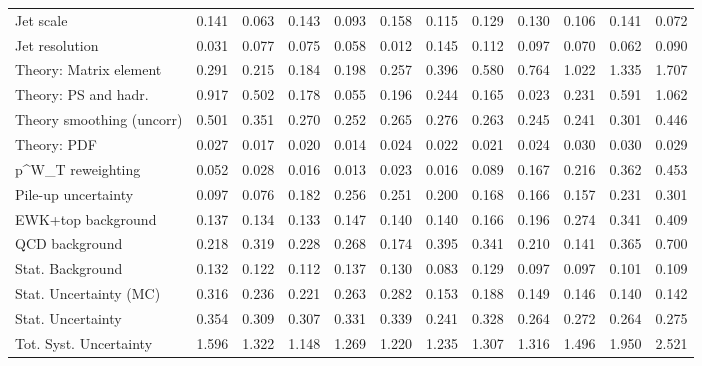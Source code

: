 \begin{tabular}{l|p{0.6cm}p{0.6cm}p{0.6cm}p{0.6cm}p{0.6cm}p{0.6cm}p{0.6cm}p{0.6cm}p{0.6cm}p{0.6cm}p{0.6cm}}
Jet scale                                & 0.141 & 0.063 & 0.143 & 0.093 & 0.158 & 0.115 & 0.129 & 0.130 & 0.106 & 0.141 & 0.072 \\
Jet resolution                           & 0.031 & 0.077 & 0.075 & 0.058 & 0.012 & 0.145 & 0.112 & 0.097 & 0.070 & 0.062 & 0.090 \\
Theory: Matrix element                   & 0.291 & 0.215 & 0.184 & 0.198 & 0.257 & 0.396 & 0.580 & 0.764 & 1.022 & 1.335 & 1.707 \\
Theory: PS and hadr.                     & 0.917 & 0.502 & 0.178 & 0.055 & 0.196 & 0.244 & 0.165 & 0.023 & 0.231 & 0.591 & 1.062 \\
Theory smoothing (uncorr)                & 0.501 & 0.351 & 0.270 & 0.252 & 0.265 & 0.276 & 0.263 & 0.245 & 0.241 & 0.301 & 0.446 \\
Theory: PDF                              & 0.027 & 0.017 & 0.020 & 0.014 & 0.024 & 0.022 & 0.021 & 0.024 & 0.030 & 0.030 & 0.029 \\
p^{W}_{T} reweighting                    & 0.052 & 0.028 & 0.016 & 0.013 & 0.023 & 0.016 & 0.089 & 0.167 & 0.216 & 0.362 & 0.453 \\
Pile-up uncertainty                      & 0.097 & 0.076 & 0.182 & 0.256 & 0.251 & 0.200 & 0.168 & 0.166 & 0.157 & 0.231 & 0.301 \\
EWK+top background                       & 0.137 & 0.134 & 0.133 & 0.147 & 0.140 & 0.140 & 0.166 & 0.196 & 0.274 & 0.341 & 0.409 \\
QCD background                           & 0.218 & 0.319 & 0.228 & 0.268 & 0.174 & 0.395 & 0.341 & 0.210 & 0.141 & 0.365 & 0.700 \\
Stat. Background                         & 0.132 & 0.122 & 0.112 & 0.137 & 0.130 & 0.083 & 0.129 & 0.097 & 0.097 & 0.101 & 0.109 \\
Stat. Uncertainty (MC)                   & 0.316 & 0.236 & 0.221 & 0.263 & 0.282 & 0.153 & 0.188 & 0.149 & 0.146 & 0.140 & 0.142 \\
\hline
Stat. Uncertainty                        & 0.354 & 0.309 & 0.307 & 0.331 & 0.339 & 0.241 & 0.328 & 0.264 & 0.272 & 0.264 & 0.275 \\
\hline
Tot. Syst. Uncertainty                   & 1.596 & 1.322 & 1.148 & 1.269 & 1.220 & 1.235 & 1.307 & 1.316 & 1.496 & 1.950 & 2.521 \\
\hline
\end{tabular}
